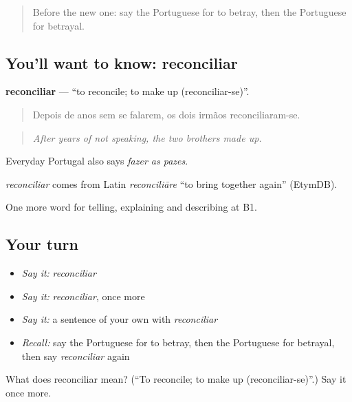 \label{lesson:PT-C497-reconciliar}



\begin{quote}
Before the new one: say the Portuguese for to betray, then the Portuguese for betrayal.
\end{quote}

\subsection*{You'll want to know: reconciliar}
\textbf{reconciliar} — \textquotedblleft{}to reconcile; to make up (reconciliar-se)\textquotedblright{}.

\begin{quote}
Depois de anos sem se falarem, os dois irmãos reconciliaram-se.
\end{quote}

\begin{quote}
\emph{After years of not speaking, the two brothers made up.}
\end{quote}

Everyday Portugal also says \emph{fazer as pazes}.

\begin{cousinweb}
\emph{reconciliar} comes from Latin \emph{reconciliāre} \textquotedblleft{}to bring together again\textquotedblright{} (EtymDB).
\end{cousinweb}

\begin{grammarlens}[title={What you've built}]
One more word for telling, explaining and describing at B1.
\end{grammarlens}

\subsection*{Your turn}
\begin{itemize}
\raggedright
  \item \emph{Say it:} \emph{reconciliar}
  \item \emph{Say it:} \emph{reconciliar}, once more
  \item \emph{Say it:} a sentence of your own with \emph{reconciliar}
  \item \emph{Recall:} say the Portuguese for to betray, then the Portuguese for betrayal, then say \emph{reconciliar} again
\end{itemize}

\begin{tcolorbox}[breakable,colback=teal!4,colframe=teal!35!black,title={Before you move on}]
What does reconciliar mean? (\textquotedblleft{}To reconcile; to make up (reconciliar-se)\textquotedblright{}.) Say it once more.
\end{tcolorbox}
